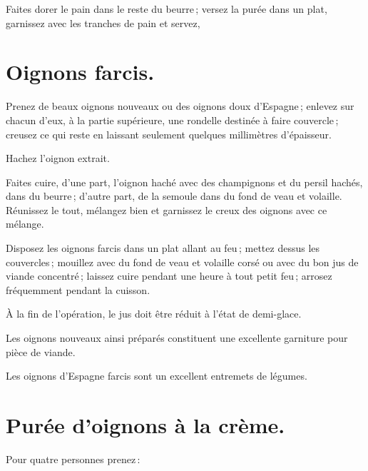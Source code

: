 Faites dorer le pain dans le reste du beurre ; versez la purée dans un plat,
garnissez avec les tranches de pain et servez,

\section*{\centering Oignons farcis.}
{}

Prenez de beaux oignons nouveaux ou des oignons doux d'Espagne ; enlevez sur
chacun d'eux, à la partie supérieure, une rondelle destinée à faire couvercle ;
creusez ce qui reste en laissant seulement quelques millimètres d'épaisseur.

Hachez l'oignon extrait.

Faites cuire, d'une part, l'oignon haché avec des champignons et du persil
hachés, dans du beurre ; d'autre part, de la semoule dans du fond de veau et
volaille. Réunissez le tout, mélangez bien et garnissez le creux des oignons
avec ce mélange.

Disposez les oignons farcis dans un plat allant au feu ; mettez dessus les
couvercles ; mouillez avec du fond de veau et volaille corsé ou avec du bon jus
de viande concentré ; laissez cuire pendant une heure à tout petit feu ;
arrosez fréquemment pendant la cuisson.

À la fin de l'opération, le jus doit être réduit à l'état de demi-glace.

\medskip

Les oignons nouveaux ainsi préparés constituent une excellente garniture pour
pièce de viande.

\medskip

Les oignons d'Espagne farcis sont un excellent entremets de légumes.

\section*{\centering Purée d'oignons à la crème.}
{}

Pour quatre personnes prenez :

